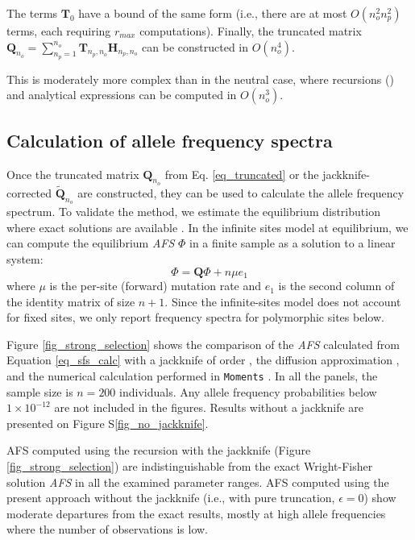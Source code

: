 \documentclass[review,nonatbib]{elsarticle}
\newcommand{\sgcomment}[1]{{\color{red}{SG: #1}}}
\begin{document}
The terms  $\mathbf{T}_{0}$ have a bound of the same form (i.e., there are at most $O(n_o^2 n_p^2)$
terms, each requiring $r_{max}$ computations).  Finally, the truncated matrix $\mathbf{Q}_{n_o} =
\sum_{n_p=1}^{n_{o}} \mathbf{T}_{n_p,n_o} \mathbf{H}_{n_p,n_o}$ can be constructed in $O(n_o^4)$.

This is moderately more complex than in the neutral case, where recursions (\cite{BhaskarEtAl2014})
 and analytical expressions \cite{Lessard} can be computed in $O(n_o^3).$


\subsection{Calculation of allele frequency spectra}
\label{subsec_afs}

Once the truncated matrix $\mathbf{Q}_{n_o}$ from Eq. \ref{eq_truncated} or 
the jackknife-corrected  $\tilde {\mathbf{Q}}_{n_o}$ are constructed, they can be
used to calculate the allele frequency spectrum. To validate the method, we estimate the equilibrium
distribution where exact solutions are available \citep{Krukov2016}. In the infinite sites model at
equilibrium, we can compute the equilibrium \textit{AFS} $\Phi$ in a finite sample as a solution to
a linear system:
\begin{equation}
  \label{eq_sfs_calc}
  \Phi = \mathbf{Q}\Phi  + n \mu e_1
\end{equation}
where $\mu$ is the per-site (forward) mutation rate and $e_1$ is the second column of the identity
matrix of size $n+1.$ Since the infinite-sites model does not account for fixed sites,
we only report frequency spectra for polymorphic sites below.

Figure \ref{fig_strong_selection} shows the comparison of the \textit{AFS} calculated from Equation
\ref{eq_sfs_calc} with a jackknife of order \sgcomment{3},
the diffusion approximation \cite[eq. 9.23]{Ewens2004}, and the numerical
calculation performed in \texttt{Moments} \citep{JouganousEtAl2017}. In all the panels, the sample
size is $n=200$ individuals. Any allele frequency probabilities below $1\times10^{-12}$ are not
included in the figures. Results without a jackknife are presented on Figure S\ref{fig_no_jackknife}. 

AFS computed using the recursion with the jackknife (Figure \ref{fig_strong_selection}) are 
indistinguishable from the exact Wright-Fisher solution \textit{AFS} in all the examined 
parameter ranges. AFS computed using the present approach without the jackknife 
(i.e., with pure truncation, $\epsilon = 0$) show moderate departures from the exact results, 
mostly at high allele frequencies where the number of observations is low.
\end{document}
